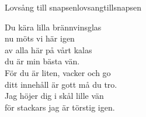 \begin{song}{Lovsång till snapsen}{lovsangtillsnapsen}
\begin{vers}
Du kära lilla brännvinsglas\\
nu möts vi här igen\\
av alla här på vårt kalas\\
du är min bästa vän.\\
För du är liten, vacker och go\\
ditt innehåll är gott må du tro.\\
Jag höjer dig i skål lille vän\\
för stackars jag är törstig igen.\\
\end{vers}
\end{song}
